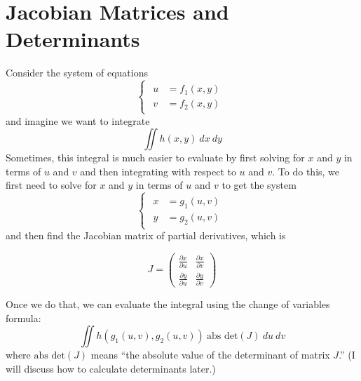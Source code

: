 \section{Jacobian Matrices and Determinants}

Consider the system of equations 
\begin{equation*}
    \begin{cases}
        \begin{aligned}
            u &= f_1(x, y) \\ 
            v &= f_2(x, y)
        \end{aligned}
    \end{cases}
\end{equation*}
and imagine we want to integrate 
\begin{equation*}
    \iint h(x, y)\ dx\ dy
\end{equation*}
Sometimes, this integral is much easier to evaluate by first solving for $x$ and $y$ in terms of 
$u$ and $v$ and then integrating with respect to $u$ and $v$. To do this, we first need to solve 
for $x$ and $y$ in terms of $u$ and $v$ to get the system 
\begin{equation*}
    \begin{cases}
        \begin{aligned}
            x &= g_1(u, v) \\ 
            y &= g_2(u, v)
        \end{aligned}
    \end{cases}
\end{equation*}
and then find the Jacobian matrix of partial derivatives, which is
{
    \renewcommand{\arraystretch}{1.5}
    \setlength{\arraycolsep}{6pt}

    \begin{equation*}
        J = 
        \begin{pmatrix}
            \frac{\partial x}{\partial u} & \frac{\partial x}{\partial v} \\ 
            \frac{\partial y}{\partial u} & \frac{\partial y}{\partial v}
        \end{pmatrix}
    \end{equation*}
}
Once we do that, we can evaluate the integral using the change of variables formula:
\begin{equation} \label{eqn:CoV}
    \iint h(g_1(u, v), g_2(u, v))\ \text{abs det}(J)\ du\ dv
\end{equation}
where $\text{abs det}(J)$ means ``the absolute value of the determinant of matrix $J$.'' (I 
will discuss how to calculate determinants later.) 

